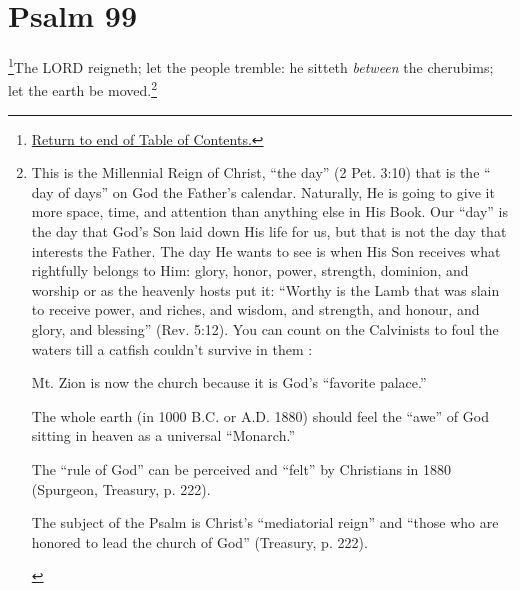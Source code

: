 \chapter{Psalm 99}
\footnote{\textcolor[rgb]{0.00,0.25,0.00}{\hyperlink{TOC}{Return to end of Table of Contents.}}}\textcolor[rgb]{0.00,0.00,1.00}{The LORD reigneth; let the people tremble: he sitteth \emph{between} the cherubims; let the earth be moved.}\footnote{This is the Millennial Reign of Christ, “the
day” (2 Pet. 3:10) that is the “ day of days”
on God the Father’s calendar. Naturally, He
is going to give it more space, time, and
attention than anything else in His Book. Our
“day” is the day that God’s Son laid down
His life for us, but that is not the day that
interests the Father. The day He wants to see
is when His Son receives what rightfully
belongs to Him: glory, honor, power,
strength, dominion, and worship or as the
heavenly hosts put it: “Worthy is the Lamb
that was slain to receive power, and riches,
and wisdom, and strength, and honour,
and glory, and blessing” (Rev. 5:12).
You can count on the Calvinists to foul the
waters till a catfish couldn’t survive in them \cite{Ruckman1992psalms}:
\begin{compactenum}
\item Mt. Zion is now the church because it is God’s “favorite palace.”
\item The whole earth (in 1000 B.C. or A.D. 1880) should feel the “awe” of God sitting in heaven as a universal “Monarch.”
\item The “rule of God” can be perceived and “felt” by Christians in 1880 (Spurgeon, Treasury, p. 222).
\item The subject of the Psalm is Christ’s “mediatorial reign” and “those who are honored to lead the church of God”
(Treasury, p. 222).
\end{compactenum}
}
